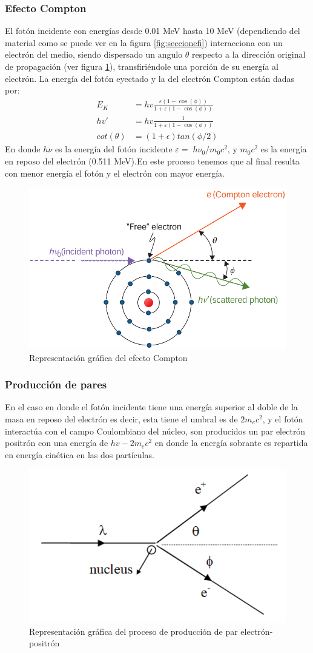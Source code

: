 \documentclass[onecolumn,12pt]{article} %
\begin{document}
\subsubsection*{Efecto Compton}
 El fotón incidente con energías desde 0.01 MeV hasta 10 MeV (dependiendo del material como se puede ver en la figura \ref{fig:seccionefi})  interacciona con un electrón del medio, siendo dispersado un  angulo $\theta$ respecto a la dirección original de propagación (ver figura \ref{fig:compton}), transfiriéndole una  porción de su energía al electrón\cite{Podgorsak2005}. La energía del fotón eyectado y la del electrón Compton están dadas por:
\begin{align*}
    E_{K}&=hv\frac{\varepsilon(1-\cos(\phi))}{1+\varepsilon(1-\cos(\phi))}\\
    hv'&=hv\frac{1}{1+\varepsilon(1-\cos(\phi))}\\
    cot(\theta)&=(1+\epsilon) tan(\phi/2)
\end{align*}
En donde $h\nu$ es la energía del fotón incidente $\varepsilon =\; {h\nu_{0}}/{m_{0} c^{2}}$, y  $ m_{0}c^{2} $ es la energía en reposo del electrón (0.511 MeV).En este proceso tenemos que al final resulta con menor energía el fotón y el electrón con mayor energía.  
\begin{figure}[H]
    \centering
    \includegraphics[width=0.5\linewidth]{img_intro/efectoCompton.png}
    \caption{Representación gráfica del efecto Compton}
    \label{fig:compton}
\end{figure}


\subsubsection*{Producción de pares}
En el caso en donde el fotón incidente tiene una energía superior al doble de la masa en reposo del electrón es decir, esta tiene el umbral es de $2m_ec^2$, y el fotón interactúa con el campo Coulombiano del núcleo,  son producidos un par electrón positrón con una energía de $hv-2m_ec^2$ en donde la energía sobrante es repartida en energía cinética en las dos partículas.\cite{Podgorsak2005}
\begin{figure}[H]
    \centering
    \includegraphics[width=0.5\linewidth]{img_intro/proPares.png}
    \caption{Representación gráfica del proceso de producción de par electrón-positrón}
    \label{fig:proPares}
\end{figure}
\end{document}

